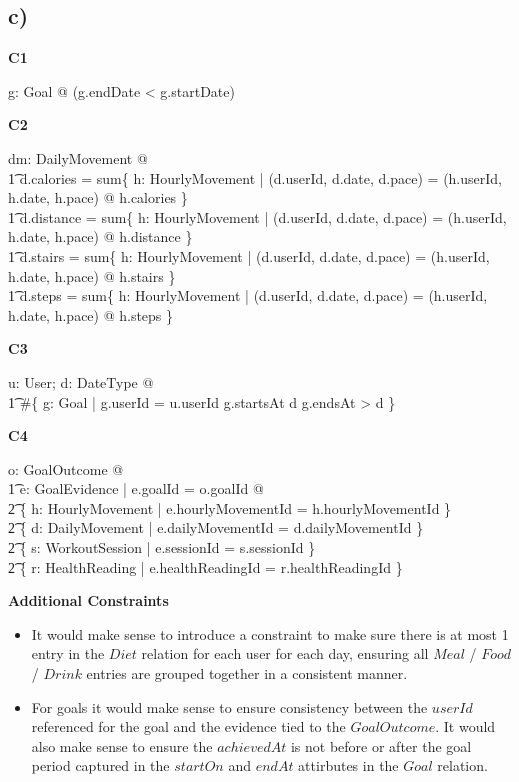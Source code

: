 \documentclass{article}
\begin{document}
\subsection*{\small c)}

\textbf{\small{C1}}
\begin{zed}
\forall g: Goal @ \lnot (g.endDate < g.startDate) \\
\end{zed}
\textbf{\small{C2}}
\begin{zed}
\forall dm: DailyMovement @ \\
    \t1 d.calories = sum\{ h: HourlyMovement | (d.userId, d.date, d.pace) = (h.userId, h.date, h.pace) @ h.calories \} \\
    \t1 d.distance = sum\{ h: HourlyMovement | (d.userId, d.date, d.pace) = (h.userId, h.date, h.pace) @ h.distance \} \\
    \t1 d.stairs = sum\{ h: HourlyMovement | (d.userId, d.date, d.pace) = (h.userId, h.date, h.pace) @ h.stairs \} \\
    \t1 d.steps = sum\{ h: HourlyMovement | (d.userId, d.date, d.pace) = (h.userId, h.date, h.pace) @ h.steps \} \\
\end{zed}
\textbf{\small{C3}}
\begin{zed}
\forall u: User; d: DateType @ \\
\t1 \#\{ g: Goal | g.userId = u.userId \land g.startsAt \leq d \land g.endsAt > d \} 
\end{zed}
\textbf{\small{C4}}
\begin{zed}
\forall o: GoalOutcome @ \\
\t1 \exists e: GoalEvidence | e.goalId = o.goalId @ \\
\t2 \{ h: HourlyMovement | e.hourlyMovementId = h.hourlyMovementId \} \neq \emptyset \lor \\
\t2 \{ d: DailyMovement | e.dailyMovementId = d.dailyMovementId \} \neq \emptyset \lor \\
\t2 \{ s: WorkoutSession | e.sessionId = s.sessionId \} \neq \emptyset \\
\t2 \{ r: HealthReading | e.healthReadingId = r.healthReadingId \} \neq \emptyset \lor \\
\end{zed}
\textbf{\small{Additional Constraints}}

\begin{itemize}
  \item It would make sense to introduce a constraint to make sure there is at most 1 entry in the $Diet$ relation for each user for each day, ensuring all $Meal$ / $Food$ / $Drink$ entries are grouped together in a consistent manner.
  \item For goals it would make sense to ensure consistency between the $userId$ referenced for the goal and the evidence tied to the $GoalOutcome$. It would also make sense to ensure the $achievedAt$ is not before or after the goal period captured in the $startOn$ and $endAt$ attirbutes in the $Goal$ relation.
\end{itemize}
\end{document}
